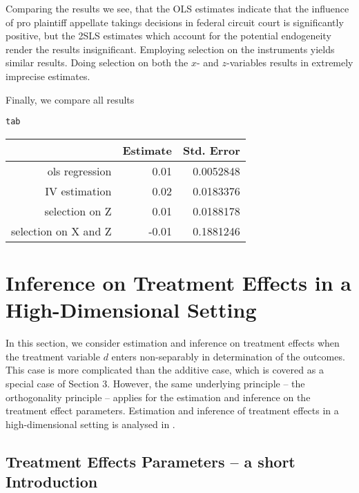 \documentclass{amsart}\usepackage[]{graphicx}\usepackage[]{color}
\makeatletter
\newcommand{\hlstd}[1]{\textcolor[rgb]{0.345,0.345,0.345}{#1}}%
\newenvironment{kframe}{%
 \def\at@end@of@kframe{}%
 \ifinner\ifhmode%
  \def\at@end@of@kframe{\end{minipage}}%
  \begin{minipage}{\columnwidth}%
 \fi\fi%
 \def\FrameCommand##1{\hskip\@totalleftmargin \hskip-\fboxsep
 \colorbox{shadecolor}{##1}\hskip-\fboxsep
     \hskip-\linewidth \hskip-\@totalleftmargin \hskip\columnwidth}%
 \MakeFramed {\advance\hsize-\width
   \@totalleftmargin\z@ \linewidth\hsize
   \@setminipage}}%
 {\par\unskip\endMakeFramed%
 \at@end@of@kframe}
\makeatother
\begin{document}
Comparing the results we see, that the OLS estimates indicate that the influence  of pro plaintiff appellate takings decisions in federal circuit court is significantly positive, but the 2SLS estimates which account for the potential endogeneity render the results insignificant. Employing selection on the instruments yields similar results. Doing selection on both the $x$- and $z$-variables results in extremely imprecise estimates.

Finally, we compare all results



\begin{kframe}
\begin{alltt}
\hlstd{tab}
\end{alltt}
\end{kframe}%
\begin{table}[ht]
\centering
\begin{tabular}{rrr}
  \hline
 & Estimate & Std. Error \\ 
  \hline
ols regression & 0.01 & 0.0052848 \\ 
  IV estimation  & 0.02 & 0.0183376 \\ 
  selection on Z & 0.01 & 0.0188178 \\ 
  selection on X and Z & -0.01 & 0.1881246 \\ 
   \hline
\end{tabular}
\end{table}



\section{Inference on Treatment Effects in a High-Dimensional Setting}

In this section, we consider estimation and inference on treatment effects when the treatment variable $d$ enters non-separably in determination of the outcomes. This case is more complicated than the additive case, which is covered as a special case of Section 3. However, the same underlying principle -- the orthogonality principle -- applies for the estimation and inference on the treatment effect parameters. Estimation and inference of treatment effects in a high-dimensional setting is analysed in \citet{BCFH:Policy}.


\subsection{Treatment Effects Parameters -- a short Introduction}
\end{document}
